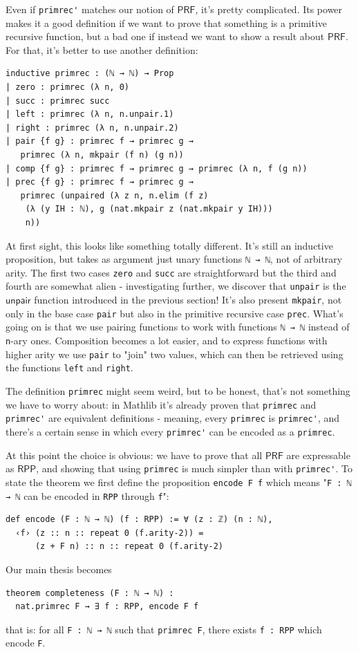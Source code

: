 \documentclass[oneside]{book}
\theoremstyle{definition}
\theoremstyle{remark}
\theoremstyle{plain}
\newcommand{\RPP}{\mathsf{RPP}}
\newcommand{\rppunpair}{\mathsf{unpair}}
\newcommand{\PRF}{\mathsf{PRF}}
\begin{document}
Even if \lstinline{primrec'} matches our notion of $\PRF$, it's pretty complicated.
Its power makes it a good definition if we want to prove that something is a primitive recursive function,
but a bad one if instead we want to show a result about $\PRF$.
For that, it's better to use another definition:
\begin{lstlisting}
inductive primrec : (ℕ → ℕ) → Prop
| zero : primrec (λ n, 0)
| succ : primrec succ
| left : primrec (λ n, n.unpair.1)
| right : primrec (λ n, n.unpair.2)
| pair {f g} : primrec f → primrec g →
   primrec (λ n, mkpair (f n) (g n))
| comp {f g} : primrec f → primrec g → primrec (λ n, f (g n))
| prec {f g} : primrec f → primrec g →
   primrec (unpaired (λ z n, n.elim (f z)
    (λ (y IH : ℕ), g (nat.mkpair z (nat.mkpair y IH)))
    n))
\end{lstlisting}
At first sight, this looks like something totally different.
It's still an inductive proposition, but takes as argument just unary functions \lstinline{ℕ → ℕ}, not of arbitrary arity.
The first two cases \lstinline{zero} and \lstinline{succ} are straightforward but the third and fourth are somewhat alien -
investigating further, we discover that \lstinline{unpair} is the $\rppunpair$ function introduced in the previous section!
It's also present \lstinline{mkpair}, not only in the base case \lstinline{pair} but also in the primitive recursive case \lstinline{prec}.
What's going on is that we use pairing functions to work with functions \lstinline{ℕ → ℕ} instead of \lstinline{n}-ary ones.
Composition becomes a lot easier, and to express functions with higher arity we use \lstinline{pair} to "join" two values,
which can then be retrieved using the functions \lstinline{left} and \lstinline{right}.

The definition \lstinline{primrec} might seem weird, but to be honest, that's not something we have to worry about:
in Mathlib it's already proven that \lstinline{primrec} and \lstinline{primrec'} are equivalent definitions - meaning,
every \lstinline{primrec} is \lstinline{primrec'},
and there's a certain sense in which every \lstinline{primrec'} can be encoded as a \lstinline{primrec}.

At this point the choice is obvious: we have to prove that all $\PRF$ are expressable as $\RPP$,
and showing that using \lstinline{primrec} is much simpler than with \lstinline{primrec'}.
To state the theorem we first define the proposition \lstinline{encode F f} which means
"\lstinline{F : ℕ → ℕ} can be encoded in \lstinline{RPP} through \lstinline{f}":
\begin{lstlisting}
def encode (F : ℕ → ℕ) (f : RPP) := ∀ (z : ℤ) (n : ℕ),
  ‹f› (z :: n :: repeat 0 (f.arity-2)) =
      (z + F n) :: n :: repeat 0 (f.arity-2)
\end{lstlisting}
Our main thesis becomes
\begin{lstlisting}
theorem completeness (F : ℕ → ℕ) :
  nat.primrec F → ∃ f : RPP, encode F f
\end{lstlisting}
that is: for all \lstinline{F : ℕ → ℕ} such that \lstinline{primrec F},
there exists \lstinline{f : RPP} which encode \lstinline{F}.
\end{document}
